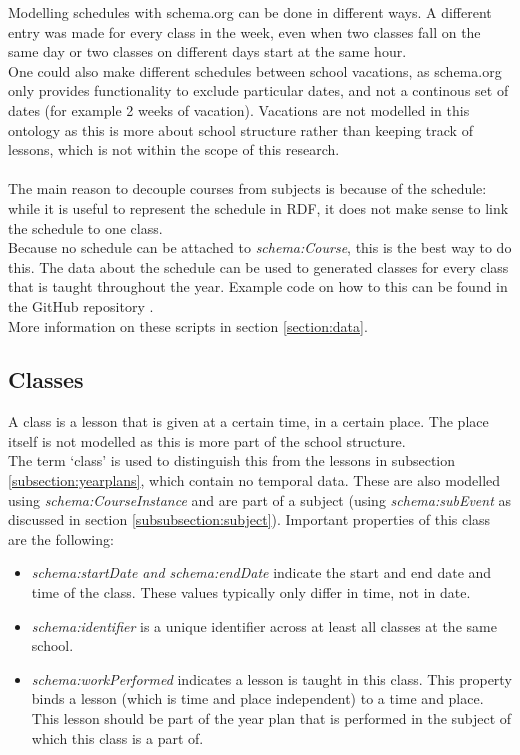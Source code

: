 \documentclass[a4paper]{report}
\begin{document}
    Modelling schedules with schema.org can be done in different ways. A different entry was made for every class in the week, even when two classes fall on the same day or two classes on different days start at the same hour.\\
    One could also make different schedules between school vacations, as schema.org only provides functionality to exclude particular dates, and not a continous set of dates (for example 2 weeks of vacation). 
    Vacations are not modelled in this ontology as this is more about school structure rather than keeping track of lessons, which is not within the scope of this research. \\ \\
    The main reason to decouple courses from subjects is because of the schedule: while it is useful to represent the schedule in RDF, it does not make sense to link the schedule to one class.\\
    Because no schedule can be attached to \textit{schema:Course}, this is the best way to do this.
    The data about the schedule can be used to generated classes for every class that is taught throughout the year. Example code on how to this can be found in the GitHub repository \cite{repo}.\\
    More information on these scripts in section \ref{section:data}.

    \subsection{Classes}
    A class is a lesson that is given at a certain time, in a certain place. The place itself is not modelled as this is more part of the school structure.\\
    The term `class' is used to distinguish this from the lessons in subsection \ref{subsection:yearplans}, which contain no temporal data.
    These are also modelled using \textit{schema:CourseInstance} and are part of a subject (using \textit{schema:subEvent} as discussed in section \ref{subsubsection:subject}).
    Important properties of this class are the following:
    \begin{itemize}
        \item \emph{schema:startDate and schema:endDate} indicate the start and end date and time of the class. These values typically only differ in time, not in date.
        \item \emph{schema:identifier} is a unique identifier across at least all classes at the same school.
        \item \emph{schema:workPerformed} indicates a lesson is taught in this class. This property binds a lesson (which is time and place independent) to a time and place.
        This lesson should be part of the year plan that is performed in the subject of which this class is a part of.
    \end{itemize}
\end{document}
